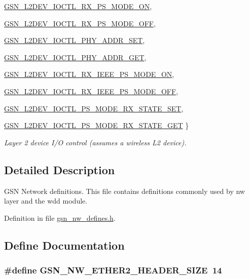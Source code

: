 \begin{DoxyCompactItemize}
\par
\hyperlink{a00670_gga8d699f24bea4c9cf889e2cd1e854d06ea91a8bb3cf452c123d373d10055b3056c}{GSN\_\-L2DEV\_\-IOCTL\_\-RX\_\-PS\_\-MODE\_\-ON}, 
\par
\hyperlink{a00670_gga8d699f24bea4c9cf889e2cd1e854d06eaa8650c6bbf86242e8d10384073894f4d}{GSN\_\-L2DEV\_\-IOCTL\_\-RX\_\-PS\_\-MODE\_\-OFF}, 
\par
\hyperlink{a00670_gga8d699f24bea4c9cf889e2cd1e854d06ea41e5f14dfcdd5084cccdfdcf188c9c12}{GSN\_\-L2DEV\_\-IOCTL\_\-PHY\_\-ADDR\_\-SET}, 
\par
\hyperlink{a00670_gga8d699f24bea4c9cf889e2cd1e854d06ea22b65238a5b76daf10c1c8dfa51374a5}{GSN\_\-L2DEV\_\-IOCTL\_\-PHY\_\-ADDR\_\-GET}, 
\par
\hyperlink{a00670_gga8d699f24bea4c9cf889e2cd1e854d06eaa9cbcab3a1533297188cbb315c2525d3}{GSN\_\-L2DEV\_\-IOCTL\_\-RX\_\-IEEE\_\-PS\_\-MODE\_\-ON}, 
\par
\hyperlink{a00670_gga8d699f24bea4c9cf889e2cd1e854d06eaa7cefeecba35a72029c8318038a52e6f}{GSN\_\-L2DEV\_\-IOCTL\_\-RX\_\-IEEE\_\-PS\_\-MODE\_\-OFF}, 
\par
\hyperlink{a00670_gga8d699f24bea4c9cf889e2cd1e854d06ea9cd933f898f7daf3dc334f75fc9d9577}{GSN\_\-L2DEV\_\-IOCTL\_\-PS\_\-MODE\_\-RX\_\-STATE\_\-SET}, 
\par
\hyperlink{a00670_gga8d699f24bea4c9cf889e2cd1e854d06ea50d8640fbca1d94a5c60aa20034b20c0}{GSN\_\-L2DEV\_\-IOCTL\_\-PS\_\-MODE\_\-RX\_\-STATE\_\-GET}
 \}
\begin{DoxyCompactList}\small\item\em Layer 2 device I/O control (assumes a wireless L2 device). \end{DoxyCompactList}\end{DoxyCompactItemize}


\subsection{Detailed Description}
GSN Network definitions. This file contains definitions commonly used by nw layer and the wdd module. 

Definition in file \hyperlink{a00533_source}{gsn\_\-nw\_\-defines.h}.



\subsection{Define Documentation}
\hypertarget{a00533_a44848f957b5ff584fc8df72c554e9283}{
\subsubsection[{GSN\_\-NW\_\-ETHER2\_\-HEADER\_\-SIZE}]{\setlength{\rightskip}{0pt plus 5cm}\#define GSN\_\-NW\_\-ETHER2\_\-HEADER\_\-SIZE~14}}
\label{a00533_a44848f957b5ff584fc8df72c554e9283}


